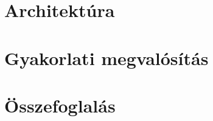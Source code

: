 \documentclass[12pt, twosides]{report}
\begin{document}

\chapter{Architektúra}


\chapter{Gyakorlati megvalósítás}


\chapter{Összefoglalás}





%
\end{document}
